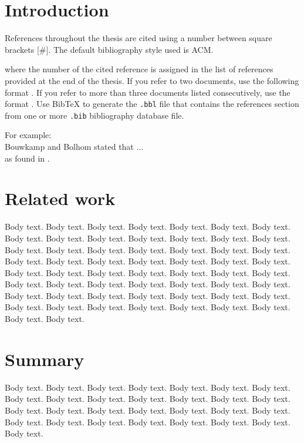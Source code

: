 
\section{Introduction}

References throughout the thesis are cited using a number between square brackets [\#]. The default bibliography style used is ACM. 

where the number of the cited reference is assigned in the list of references provided at the end of the thesis. If you refer to two documents, use the following format \cite{Bouwkamp1963,Newmark1971}.  If you refer to more than three documents listed consecutively, use the format 
\cite{Caravani1973,Newmark1971,INFORMS}. Use BibTeX to generate the \texttt{.bbl} file that contains the references section from one or more \texttt{.bib} bibliography database file. 
  
For example: \\
Bouwkamp and Bolhom \cite{Bouwkamp1963} stated that $\ldots$ \\ 
as found in \cite{Ibrahim2012}.


\section{Related work}

Body text. Body text. Body text. Body text. Body text. Body text. Body text. Body text. Body text. Body text. Body text. Body text. Body text. Body text. Body text. Body text. Body text. Body text. Body text. Body text. Body text. Body text. Body text. Body text. Body text. Body text. Body text. Body text. Body text.
Body text. Body text. Body text. Body text. Body text. Body text. Body text. Body text. Body text. Body text. Body text. Body text. Body text. Body text. Body text. Body text. Body text. Body text. Body text. Body text. Body text. Body text. Body text. Body text. Body text. Body text. Body text. Body text. Body text.

\section{Summary}

Body text. Body text. Body text. Body text. Body text. Body text. Body text. Body text. Body text. Body text. Body text. Body text. Body text. Body text. Body text. Body text. Body text. Body text. Body text. Body text. Body text. Body text. Body text. Body text. Body text. Body text. Body text. Body text. Body text.

